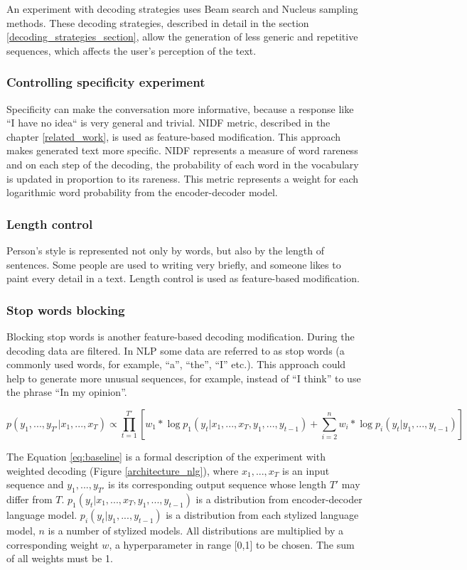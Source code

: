 An experiment with decoding strategies uses Beam search and Nucleus sampling methods. These decoding strategies, described in detail in the section \ref{decoding_strategies_section}, allow the generation of less generic and repetitive sequences, which affects the user's perception of the text.

\subsubsection{Controlling specificity experiment}
Specificity can make the conversation more informative, because a response like ``I have no idea`` is very general and trivial. NIDF metric, described in the chapter \ref{related_work}, is used as feature-based modification. This approach makes generated text more specific. NIDF represents a measure of word rareness and on each step of the decoding, the probability of each word in the vocabulary is updated in proportion to its rareness. This metric represents a weight for each logarithmic word probability from the encoder-decoder model.

\subsubsection{Length control}
Person's style is represented not only by words, but also by the length of sentences. Some people are used to writing very briefly, and someone likes to paint every detail in a text. Length control is used as feature-based modification.

\subsubsection{Stop words blocking}
Blocking stop words is another feature-based decoding modification. During the decoding data are filtered. In NLP some data are referred to as stop words (a commonly used words, for example, ``a'', ``the'', ``I'' etc.). This approach could help to generate more unusual sequences, for example, instead of ``I think'' to use the phrase ``In my opinion''.

\begin{equation} \label{eq:baseline}
p(y_1, ... , y_{T'}|x_1, ... , x_T) \propto \prod_{t=1}^{T'} [w_1 * \log p_1(y_t|x_1, ... , x_T, y_1, ... , y_{t-1}) + \sum_{i=2}^n w_i * \log p_i(y_t| y_1, ... , y_{t-1})]
\end{equation}

The Equation \ref{eq:baseline} is a formal description of the experiment with weighted decoding (Figure \ref{architecture_nlg}), where $x_1, ... , x_T$ is an input sequence and $y_1, ... , y_{T'}$ is its corresponding output sequence whose length $T'$ may differ from $T$. $p_1(y_t|x_1, ... , x_T, y_1, ... , y_{t-1})$ is a distribution from encoder-decoder language model. $p_i(y_t|y_1, ... , y_{t-1})$ is a distribution from each stylized language model, $n$ is a number of stylized models. All distributions are multiplied by a corresponding weight $w$, a hyperparameter in range [0,1] to be chosen. The sum of all weights must be 1.

